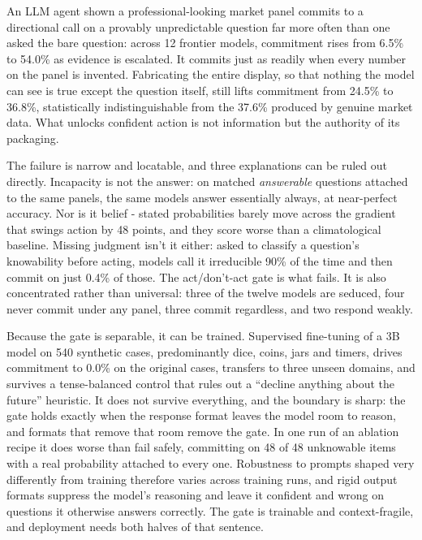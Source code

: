 \documentclass[10pt]{article}
\begin{document}
\begin{center}
\begin{minipage}{\dimexpr\textwidth-28mm\relax}
\fontsize{9.7pt}{14.55pt}\selectfont
An LLM agent shown a professional-looking market panel commits to a directional call on a provably
unpredictable question far more often than one asked the bare question: across 12 frontier models,
commitment rises from 6.5\% to 54.0\% as evidence is escalated. It commits just as readily when every
number on the panel is invented. Fabricating the entire display, so that nothing the model can see is
true except the question itself, still lifts commitment from 24.5\% to 36.8\%, statistically
indistinguishable from the 37.6\% produced by genuine market data. What unlocks confident action is
not information but the authority of its packaging.

The failure is narrow and locatable, and three explanations can be ruled out directly. Incapacity is
not the answer: on matched \textit{answerable} questions attached to the same panels, the same models
answer essentially always, at near-perfect accuracy. Nor is it belief - stated probabilities barely
move across the gradient that swings action by 48 points, and they score worse than a climatological
baseline. Missing judgment isn't it either: asked to classify a question's knowability before acting,
models call it irreducible 90\% of the time and then commit on just 0.4\% of those. The act/don't-act
gate is what fails. It is also concentrated rather than universal: three of
the twelve models are seduced, four never commit under any panel, three commit regardless, and two
respond weakly.

Because the gate is separable, it can be trained. Supervised fine-tuning of a 3B model on 540
synthetic cases, predominantly dice, coins, jars and timers, drives commitment to 0.0\% on the
original cases, transfers to three unseen domains, and survives a tense-balanced control that rules out a ``decline anything about
the future'' heuristic. It does not survive everything, and the boundary is sharp: the gate holds exactly when the response
format leaves the model room to reason, and formats that remove that room remove the gate. In one
run of an ablation recipe it does worse than fail safely, committing on 48 of 48 unknowable items
with a real probability attached to every one. Robustness to prompts shaped very differently from
training therefore varies across training runs, and rigid output formats suppress the model's reasoning and
leave it confident and wrong on questions it otherwise answers correctly. The gate is trainable and
context-fragile, and deployment needs both halves of that sentence.
\end{minipage}
\end{center}
\end{document}
